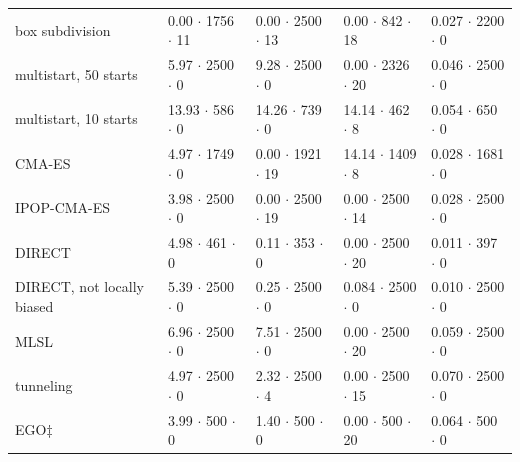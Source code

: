 \begin{table}[t]
\begin{tabular}{lllll}
    box subdivision & 0.00 $\cdot$ 1756 $\cdot$ 11 & 0.00 $\cdot$ 2500 $\cdot$ 13 & 0.00 $\cdot$ 842 $\cdot$ 18 & 0.027 $\cdot$ 2200 $\cdot$ 0 \\
    multistart, 50 starts & 5.97 $\cdot$ 2500 $\cdot$ 0 & 9.28 $\cdot$ 2500 $\cdot$ 0 & 0.00 $\cdot$ 2326 $\cdot$ 20 & 0.046 $\cdot$ 2500 $\cdot$ 0 \\
    multistart, 10 starts & 13.93 $\cdot$ 586 $\cdot$ 0 & 14.26 $\cdot$ 739 $\cdot$ 0 & 14.14 $\cdot$ 462 $\cdot$ 8 & 0.054 $\cdot$ 650 $\cdot$ 0 \\
    CMA-ES & 4.97 $\cdot$ 1749 $\cdot$ 0 & 0.00 $\cdot$ 1921 $\cdot$ 19 & 14.14 $\cdot$ 1409 $\cdot$ 8 & 0.028 $\cdot$ 1681 $\cdot$ 0 \\
    IPOP-CMA-ES & 3.98 $\cdot$ 2500 $\cdot$ 0 & 0.00 $\cdot$ 2500 $\cdot$ 19 & 0.00 $\cdot$ 2500 $\cdot$ 14 & 0.028 $\cdot$ 2500 $\cdot$ 0 \\
    DIRECT & 4.98 $\cdot$ 461 $\cdot$ 0 & 0.11 $\cdot$ 353 $\cdot$ 0 & 0.00 $\cdot$ 2500 $\cdot$ 20 & 0.011 $\cdot$ 397 $\cdot$ 0 \\
    DIRECT, not locally biased & 5.39 $\cdot$ 2500 $\cdot$ 0 & 0.25 $\cdot$ 2500 $\cdot$ 0 & 0.084 $\cdot$ 2500 $\cdot$ 0 & 0.010 $\cdot$ 2500 $\cdot$ 0 \\
    MLSL & 6.96 $\cdot$ 2500 $\cdot$ 0 & 7.51 $\cdot$ 2500 $\cdot$ 0 & 0.00 $\cdot$ 2500 $\cdot$ 20 & 0.059 $\cdot$ 2500 $\cdot$ 0 \\
    tunneling & 4.97 $\cdot$ 2500 $\cdot$ 0 & 2.32 $\cdot$ 2500 $\cdot$ 4 & 0.00 $\cdot$ 2500 $\cdot$ 15 & 0.070 $\cdot$ 2500 $\cdot$ 0 \\
    EGO$\ddagger$ & 3.99 $\cdot$ 500 $\cdot$ 0 & 1.40 $\cdot$ 500 $\cdot$ 0 & 0.00 $\cdot$ 500 $\cdot$ 20 & 0.064 $\cdot$ 500 $\cdot$ 0 \\
    \bottomrule
  \end{tabular}
\end{table}
